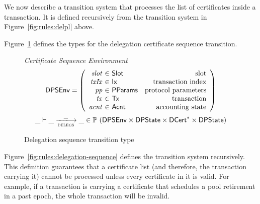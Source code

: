 We now describe a transition system that processes the list of certificates inside a transaction.
It is defined recursively from the transition system in Figure~\ref{fig:rules:delpl} above.

Figure~\ref{fig:type:delegations} defines the types for the delegation certificate sequence
transition.

\begin{figure}[hbt]
  \emph{Certificate Sequence Environment}
  \begin{equation*}
    \DPSEnv =
    \left(
      \begin{array}{r@{~\in~}lr}
        \var{slot} & \Slot & \text{slot}\\
        \var{txIx} & \Ix & \text{transaction index}\\
        \var{pp} & \PParams & \text{protocol parameters}\\
        \var{tx} & \Tx & \text{transaction} \\
        \var{acnt} & \Acnt & \text{accounting state}
      \end{array}
    \right)
  \end{equation*}
  \begin{equation*}
    \_ \vdash \_ \trans{delegs}{\_} \_ \in
    \powerset (
    \DPSEnv \times \DPState \times \seqof{\DCert} \times \DPState)
  \end{equation*}
  \caption{Delegation sequence transition type}
  \label{fig:type:delegations}
\end{figure}

Figure~\ref{fig:rules:delegation-sequence} defines the transition system recursively.
This definition guarantees that a certificate list (and therefore, the transaction carrying it)
cannot be processed unless every certificate in it is valid. For example, if a transaction is
carrying a certificate that schedules a pool retirement in a past epoch, the whole transaction
will be invalid.

